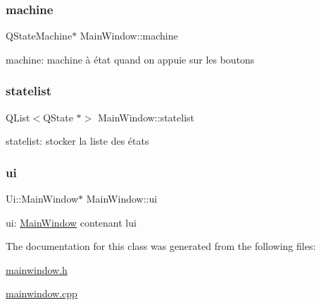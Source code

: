 \subsubsection{\texorpdfstring{machine}{machine}}
{\footnotesize\ttfamily Q\+State\+Machine$\ast$ Main\+Window\+::machine\hspace{0.3cm}{\ttfamily [private]}}

machine\+: machine à état quand on appuie sur les boutons \mbox{\label{classMainWindow_abee312bebbed8977688608c2a26e380e}} 
\subsubsection{\texorpdfstring{statelist}{statelist}}
{\footnotesize\ttfamily Q\+List$<$Q\+State $\ast$$>$ Main\+Window\+::statelist\hspace{0.3cm}{\ttfamily [private]}}

statelist\+: stocker la liste des états \mbox{\label{classMainWindow_a35466a70ed47252a0191168126a352a5}} 
\subsubsection{\texorpdfstring{ui}{ui}}
{\footnotesize\ttfamily Ui\+::\+Main\+Window$\ast$ Main\+Window\+::ui\hspace{0.3cm}{\ttfamily [private]}}

ui\+: \hyperlink{classMainWindow}{Main\+Window} contenant l\textquotesingle{}ui 

The documentation for this class was generated from the following files\+:\begin{DoxyCompactItemize}
\item 
\hyperlink{mainwindow_8h}{mainwindow.\+h}\item 
\hyperlink{mainwindow_8cpp}{mainwindow.\+cpp}\end{DoxyCompactItemize}
